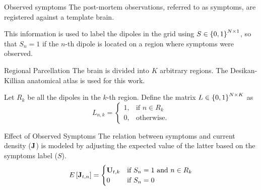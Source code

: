 %
% 

 {Observed symptoms}
The post-mortem observations, referred to as  {symptoms}, are registered against a template brain. 

This information is used to label the dipoles in the grid using
${S\in \left\{ 0,1 \right\}^{N\times 1}}$, so that $S_n = 1$ if the $n$-th dipole is located on a region where symptoms were observed.


 

 {Regional Parcellation}
The brain is divided into $K$ arbitrary regions. The Desikan-Killian anatomical atlas is used for this work.

Let $R_k$ be all the dipoles in the $k$-th region. Define the matrix $L\in \left\{ 0,1 \right\}^{N\times K}$ as
\begin{equation}
    L_{n,k} = \begin{cases}
        1, &\text{if } n\in R_k \\
        0, &\text{otherwise.}
    \end{cases}
\end{equation}


 

 {Effect of Observed Symptoms}
The relation between symptoms and current density ($\mathbf{J}$) is modeled by adjusting the expected value of the latter based on the symptoms label ($S$).
\begin{equation}
    E\left[ \mathbf{J}_{t,n} \right] = 
    \begin{cases}
        \mathbf{U}_{t,k} & \text{if } S_n=1 \text{ and } n\in R_k \\
        0 & \text{if } S_n=0
    \end{cases}
\end{equation}

